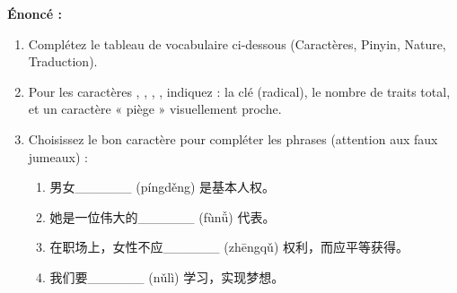 \documentclass[11pt]{article}
\newcommand{\zh}[1]{\ifmmode\text{#1}\else{#1}\fi}
\begin{document}
\begin{exoresolu}
\textbf{Énoncé :}
\begin{enumerate}
    \item Complétez le tableau de vocabulaire ci-dessous (Caractères, Pinyin, Nature, Traduction).
    \item Pour les caractères \zh{平}, \zh{妇}, \zh{争}, \zh{努}, indiquez : la clé (radical), le nombre de traits total, et un caractère « piège » visuellement proche.
    \item Choisissez le bon caractère pour compléter les phrases (attention aux faux jumeaux) :
        \begin{enumerate}
            \item 男女\_\_\_\_\_\_ (píngděng) 是基本人权。
            \item 她是一位伟大的\_\_\_\_\_\_ (fùnǚ) 代表。
            \item 在职场上，女性不应\_\_\_\_\_\_ (zhēngqǔ) 权利，而应平等获得。
            \item 我们要\_\_\_\_\_\_ (nǔlì) 学习，实现梦想。
        \end{enumerate}
\end{enumerate}


\end{exoresolu}
\end{document}
